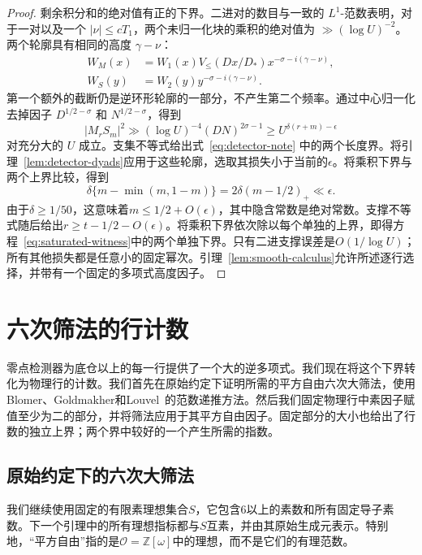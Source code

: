 \documentclass[11pt,a4paper]{article}
\numberwithin{equation}{section}
\numberwithin{figure}{section}
\theoremstyle{definition}
\theoremstyle{remark}
\begin{document}
\begin{proof}
剩余积分和的绝对值有正的下界。二进对的数目与一致的 \(L^1\)-范数表明，对于一对以及一个 \(|\nu|\le cT_1\)，两个未归一化块的乘积的绝对值为 \(\gg(\log U)^{-2}\)。两个轮廓具有相同的高度 \(\gamma-\nu\)：
\[
 \begin{split}
 W_M(x)&=W_1(x)V_{\le}(Dx/D_*)x^{-\sigma-i(\gamma-\nu)},\\
 W_S(y)&=W_2(y)y^{-\sigma-i(\gamma-\nu)}.
 \end{split}
\]
第一个额外的截断仍是逆环形轮廓的一部分，不产生第二个频率。通过中心归一化去掉因子 \(D^{1/2-\sigma}\) 和 \(N^{1/2-\sigma}\)，得到
\[
 |M_rS_m|^2\gg(\log U)^{-4}(DN)^{2\sigma-1}
 \ge U^{\delta(r+m)-\epsilon}
\]
对充分大的 \(U\) 成立。支集不等式给出式~\eqref{eq:detector-note} 中的两个长度界。将引理~\ref{lem:detector-dyads}应用于这些轮廓，选取其损失小于当前的\(\epsilon\)。将乘积下界与两个上界比较，得到
\[
 \delta\{m-\min(m,1-m)\}
   =2\delta(m-1/2)_+\ll\epsilon.
\]
由于\(\delta\ge1/50\)，这意味着\(m\le1/2+O(\epsilon)\)，其中隐含常数是绝对常数。支撑不等式随后给出\(r\ge t-1/2-O(\epsilon)\)。将乘积下界依次除以每个单独的上界，即得方程~\eqref{eq:saturated-witness}中的两个单独下界。只有二进支撑误差是\(O(1/\log U)\)；所有其他损失都是任意小的固定幂次。引理~\ref{lem:smooth-calculus}允许所述逐行选择，并带有一个固定的多项式高度因子。
\end{proof}

\section{六次筛法的行计数}\label{sec:sextic-row-count}

零点检测器为底仓以上的每一行提供了一个大的逆多项式。我们现在将这个下界转化为物理行的计数。我们首先在原始约定下证明所需的平方自由六次大筛法，使用Blomer、Goldmakher和Louvel~\cite[Section 3]{BGL}的范数递推方法。然后我们固定物理行中素因子赋值至少为二的部分，并将筛法应用于其平方自由因子。固定部分的大小也给出了行数的独立上界；两个界中较好的一个产生所需的指数。

\subsection{原始约定下的六次大筛法}

我们继续使用固定的有限素理想集合$S$，它包含$6$以上的素数和所有固定导子素数。下一个引理中的所有理想指标都与$S$互素，并由其原始生成元表示。特别地，“平方自由”指的是$\mathcal O=\mathbb Z[\omega]$中的理想，而不是它们的有理范数。
\end{document}

